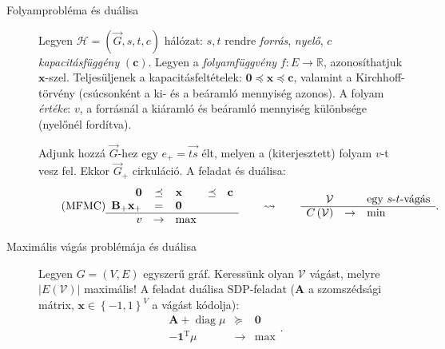 \documentclass[%
	DIV=15,appendixprefix]{scrreprt}
\theoremstyle{definition}
\theoremstyle{remark}
\DeclareMathOperator{\T}{T}
\DeclareMathOperator{\diag}{diag}
\begin{document}
%
\leavevmode
\begin{description}
	\item[Folyamprobléma és duálisa] Legyen $ \mathcal{ H } = \left( \vec{ G },{} s,{} t,{} c
		\right) $ hálózat: $ s,{} t $ rendre \emph{forrás}, \emph{nyelő}, $ c $
		\emph{kapacitásfüggény} $ \left( \mathbf{ c } \right) $. Legyen a \emph{folyamfüggvény} $ f
		\colon E \rightarrow \mathbb{ R } $, azonosíthatjuk $ \mathbf{ x } $-szel.
		Teljesüljenek a kapacitásfeltételek: $ \mathbf{ 0 } \preceq \mathbf{ x } \preceq
		\mathbf{ c } $, valamint a Kirchhoff-törvény (csúcsonként a ki- és a beáramló mennyiség
		azonos). A folyam \emph{értéke}: $ v $, a forrásnál a kiáramló és beáramló mennyiség
		különbsége (nyelőnél fordítva).

		Adjunk hozzá $ \vec{ G } $-hez egy $ e_{ + } = \overrightarrow{ t s } $ élt, melyen a
		(kiterjesztett) folyam $ v $-t vesz fel. Ekkor $ \vec{ G }_{ + } $ cirkuláció.  A feladat és
		duálisa:
		\begin{equation}\tag{MFMC}
			\begin{array}{rclcl}
				\mathbf{ 0 }							&	\preceq		&	\mathbf{ x }	&	\preceq	&	\mathbf{ c }\\
				\mathbf{ B }_{ + } \mathbf{ x }_{ + }	&	=			&	\mathbf{ 0 }	&			&	\\
				\hline
				v										&	\rightarrow	&	\max
			\end{array} \qquad \leadsto\qquad \begin{array}{rcl}
				\mathcal{ V }					&				& \text{egy $ s $-$ t $-vágás}\\
				\hline
				C \left( \mathcal{ V } \right)	&	\rightarrow	&	\min
			\end{array}.
		\end{equation}
	\item[Maximális vágás problémája és duálisa] Legyen $ G = \left( V,{} E \right) $ egyszerű gráf.
		Keressünk olyan $ \mathcal{ V } $ vágást, melyre $ \left| E \left( \mathcal{ V } \right)
		\right| $ maximális! A feladat duálisa SDP-feladat ($ \mathbf{ A } $ a szomszédsági mátrix,
		$ \mathbf{ x } \in \left\{ -1,{} 1 \right\}^{ V } $ a vágást kódolja):
		\begin{equation*}
			\begin{array}{rcl}
				\mathbf{ A } + \diag \mu 	&		\succeq	&	\mathbf{ 0 }\\
				\hline
				- \mathbf{ 1 }^{ \T } \mu	&	\rightarrow	&	\max
			\end{array}.
		\end{equation*}

\end{description}
\end{document}
